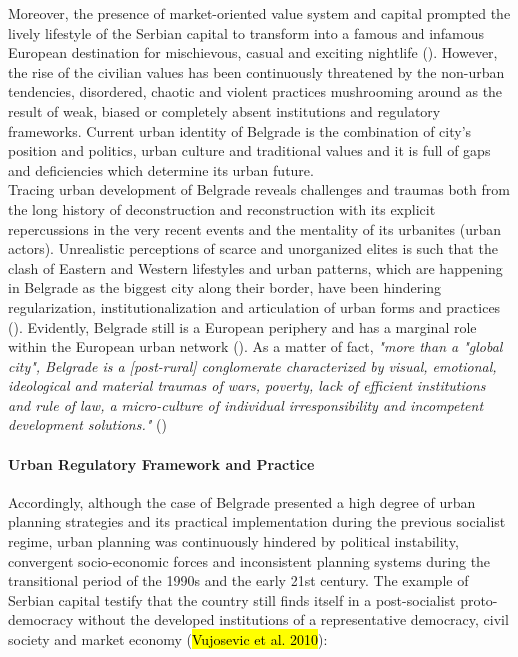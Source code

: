 \documentclass[11pt]{report}
\begin{document}
Moreover, the presence of market-oriented value system and capital prompted the lively lifestyle of the Serbian capital to transform into a famous and infamous European destination for mischievous, casual and exciting nightlife (\cite{Vanista Lazarevic in Doytchinov 2015}).
However, the rise of the civilian values has been continuously threatened by the non-urban tendencies, disordered, chaotic  and violent practices mushrooming around as the result of weak, biased or completely absent institutions and regulatory frameworks.
Current urban identity of Belgrade is the combination of city's position and politics, urban culture and traditional values and it is full of gaps and deficiencies which determine its urban future.
\\
Tracing  urban  development  of  Belgrade  reveals  challenges  and  traumas both from the long history of deconstruction and reconstruction with its explicit repercussions in the very recent events and the mentality of its urbanites (urban actors).
Unrealistic perceptions of scarce and unorganized elites is such that the clash of Eastern and Western lifestyles and urban patterns, which are  happening in Belgrade as the biggest city along their border, have been hindering regularization, institutionalization and articulation of urban forms and practices (\cite{other ref Samardzic in Doytchinov 2015}).
Evidently, Belgrade still is a European periphery and has a marginal role within the European urban network (\cite{Vujovic and Petrovic 2007}). 
As a matter of fact, \textit{"more  than  a  "global  city",  Belgrade  is  a  [post-rural]  conglomerate characterized by visual, emotional, ideological and material traumas of wars, poverty, lack of efficient institutions and rule of law, a micro-culture of  individual  irresponsibility  and  incompetent  development  solutions."} (\cite{Samardzic in Doytchinov 2015}) 
\\
\paragraph{Urban Regulatory Framework and Practice}

Accordingly, although the case of Belgrade presented a high degree of urban planning strategies and its practical implementation during the previous socialist regime, urban planning was continuously hindered by political instability, convergent socio-economic forces and inconsistent planning systems during the transitional period of the 1990s and the early 21st century. 
The example of Serbian capital testify that the country still finds itself in a post-socialist proto-democracy without the developed institutions of a representative democracy, civil society and market economy (\hl{Vujosevic et al. 2010}):
 
\end{document}
